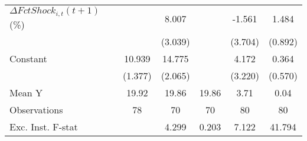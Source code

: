 {\begin{tabular}{l*{5}{c}}
\addlinespace
$ \Delta FctShock_{i,t}(t+1)$ (\%)&                     &       8.007\sym{**} &                     &      -1.561         &       1.484         \\
                    &                     &     (3.039)         &                     &     (3.704)         &     (0.892)         \\
\addlinespace
Constant            &      10.939\sym{***}&      14.775\sym{***}&                     &       4.172         &       0.364         \\
                    &     (1.377)         &     (2.065)         &                     &     (3.220)         &     (0.570)         \\
\midrule
Mean Y              &       19.92         &       19.86         &       19.86         &        3.71         &        0.04         \\
Observations        &          78         &          70         &          70         &          80         &          80         \\
Exc. Inst. F-stat   &                     &       4.299         &       0.203         &       7.122         &      41.794         \\
\bottomrule
\end{tabular}
}
